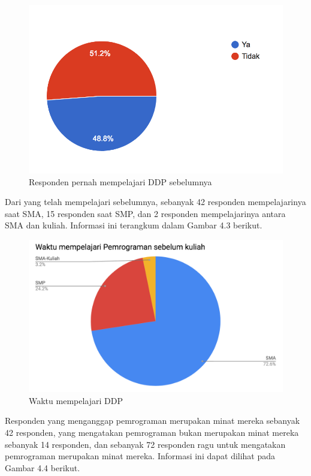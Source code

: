 	\begin{figure}
		\includegraphics[width=\linewidth]{pics/pernah-ikut-ddp-sebelum}
		\caption{Responden pernah mempelajari DDP sebelumnya}
		\centering
	\end{figure}
	Dari yang telah mempelajari sebelumnya, sebanyak 42 responden mempelajarinya saat SMA, 15 responden saat SMP, dan 2 responden mempelajarinya antara SMA dan kuliah. Informasi ini terangkum dalam Gambar 4.3 berikut.
	\begin{figure}
		\includegraphics[width=\linewidth]{pics/kapan-pernah-belajarnya}
		\caption{Waktu mempelajari DDP}
		\centering
	\end{figure}
	Responden yang menganggap pemrograman merupakan minat mereka sebanyak 42 responden, yang mengatakan pemrograman bukan merupakan minat mereka sebanyak 14 responden, dan sebanyak 72 responden ragu untuk mengatakan pemrograman merupakan minat mereka. Informasi ini dapat dilihat pada Gambar 4.4 berikut.

